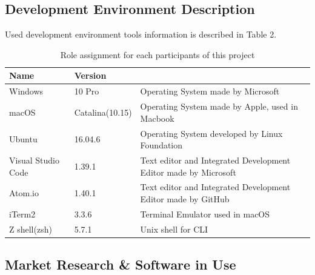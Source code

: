 \documentclass[conference,compsoc]{IEEEtran}
\begin{document}
\subsection{Development Environment Description}

Used development environment tools information is described in Table 2.

\begin{table}[ht!] \renewcommand\arraystretch{1.25}
  \begin{threeparttable}
      \caption{Role assignment for each participants of this project%
      \label{tab:table2}}    %
      \begin{tabular}{@{}l l>{\raggedright\arraybackslash}p{3.8cm}@{}}
      \toprule
      \bfseries Name & \bfseries Version & \multicolumn{1}{l}{\bfseries Description} \\
      \midrule
      Windows & 10 Pro & Operating System made by Microsoft \\
      macOS & Catalina(10.15) & Operating System made by Apple, used in Macbook \\
      Ubuntu & 16.04.6 & Operating System developed by Linux Foundation \\
      Visual Studio Code & 1.39.1 & Text editor and Integrated Development Editor made by Microsoft \\
      Atom.io & 1.40.1 & Text editor and Integrated Development Editor made by GitHub \\
      iTerm2 & 3.3.6 & Terminal Emulator used in macOS \\
      Z shell(zsh) & 5.7.1 & Unix shell for CLI \\
      \bottomrule
      \end{tabular}
  \end{threeparttable}
\end{table}

\subsection{Market Research \& Software in Use}
\end{document}

